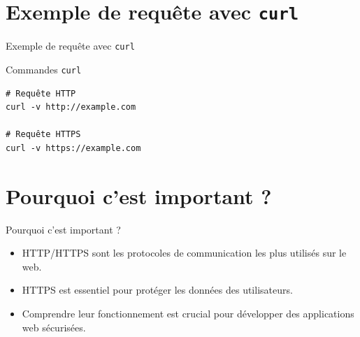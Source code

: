 \documentclass{clbeamer2024}
\begin{document}
	
	\section{Exemple de requête avec \texttt{curl}}
	\begin{frame}[fragile]{Exemple de requête avec \texttt{curl}}
		\begin{exampleblock}{Commandes \texttt{curl}}
			\begin{verbatim}
# Requête HTTP
curl -v http://example.com
				
# Requête HTTPS
curl -v https://example.com
			\end{verbatim}
		\end{exampleblock}
	\end{frame}
	
	\section{Pourquoi c'est important ?}
	\begin{frame}{Pourquoi c'est important ?}
		\begin{itemize}
			\item HTTP/HTTPS sont les protocoles de communication les plus utilisés sur le web.
			\item HTTPS est essentiel pour protéger les données des utilisateurs.
			\item Comprendre leur fonctionnement est crucial pour développer des applications web sécurisées.
		\end{itemize}
	\end{frame}
	
	
\end{document}
